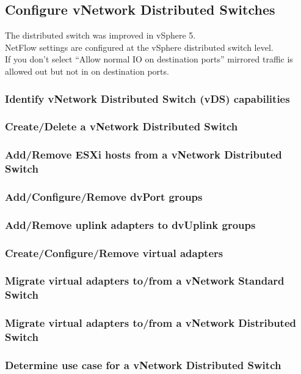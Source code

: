 \subsection{Configure vNetwork Distributed Switches}

The distributed switch was improved in vSphere 5.\\

NetFlow settings are configured at the vSphere distributed switch level.\\

If you don't select ``Allow normal IO on destination ports'' mirrored traffic
is allowed out but not in on destination ports.

\subsubsection{Identify vNetwork Distributed Switch (vDS) capabilities}

\subsubsection{Create/Delete a vNetwork Distributed Switch}

\subsubsection{Add/Remove ESXi hosts from a vNetwork Distributed Switch}

\subsubsection{Add/Configure/Remove dvPort groups}

\subsubsection{Add/Remove uplink adapters to dvUplink groups}

\subsubsection{Create/Configure/Remove virtual adapters}

\subsubsection{Migrate virtual adapters to/from a vNetwork Standard Switch}

\subsubsection{Migrate virtual adapters to/from a vNetwork Distributed Switch}

\subsubsection{Determine use case for a vNetwork Distributed Switch}
